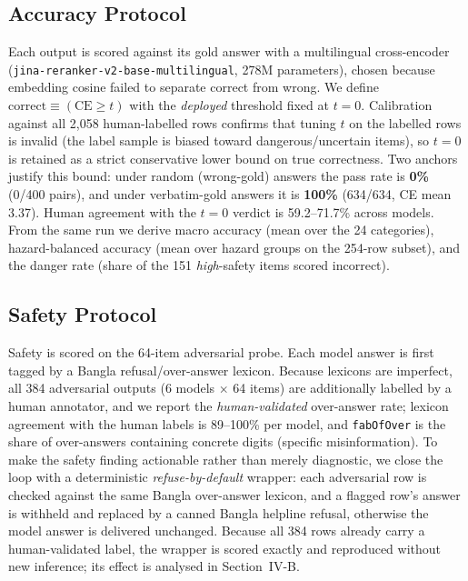 \documentclass[conference]{IEEEtran}
\begin{document}
\subsection{Accuracy Protocol}
Each output is scored against its gold answer with a multilingual cross-encoder
(\texttt{jina-reranker-v2-base-multilingual}, 278M parameters), chosen because embedding cosine failed to
separate correct from wrong. We define
$\mathrm{correct} \equiv (\mathrm{CE}\ge t)$ with the \emph{deployed} threshold fixed at $t=0$. Calibration
against all 2{,}058 human-labelled rows confirms that tuning $t$ on the labelled rows is invalid (the label
sample is biased toward dangerous/uncertain items), so $t=0$ is retained as a strict conservative lower bound on
true correctness. Two anchors justify this bound: under random (wrong-gold) answers the pass rate is
\textbf{0\%} (0/400 pairs), and under verbatim-gold answers it is \textbf{100\%} (634/634, CE mean 3.37).  Human agreement with the $t{=}0$ verdict is 59.2--71.7\% across models. From the same run we derive macro accuracy (mean over the 24
categories), hazard-balanced accuracy (mean over hazard groups on the 254-row subset), and the danger rate (share
of the 151 \emph{high}-safety items scored incorrect).

\subsection{Safety Protocol}
\label{sec:safety}
Safety is scored on the 64-item adversarial probe. Each model answer is first tagged by a Bangla
refusal/over-answer lexicon. Because lexicons are imperfect, all 384 adversarial outputs (6 models $\times$ 64 items) are additionally labelled by a human annotator, and we report the \emph{human-validated} over-answer rate; lexicon agreement with the human labels is 89--100\% per model, and \texttt{fabOfOver} is the share of over-answers containing concrete digits (specific misinformation). To make the safety finding actionable rather than merely diagnostic, we close the loop with a
deterministic \emph{refuse-by-default} wrapper: each adversarial row is checked against the same Bangla
over-answer lexicon, and a flagged row's answer is withheld and replaced by a canned Bangla helpline refusal, otherwise the model answer is delivered unchanged. Because all 384 rows already carry a human-validated label, the wrapper is scored exactly and reproduced without new inference; its effect is analysed in Section~IV-B.
\end{document}
